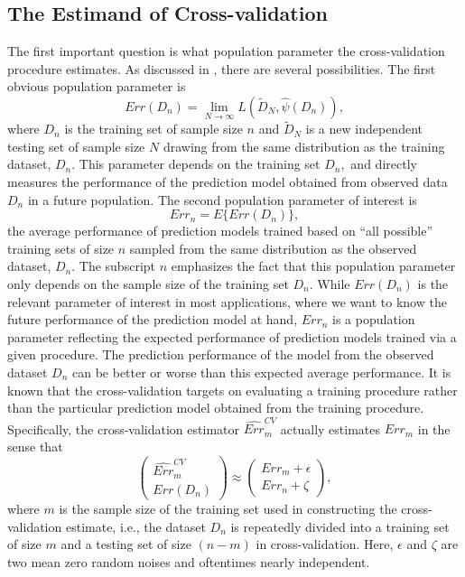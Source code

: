 \documentclass[12pt]{article}
\begin{document}
\subsection{The Estimand of Cross-validation}
The first important question is what population parameter the cross-validation procedure estimates. As discussed in \cite{bates2021cross}, there are several possibilities.  The first obvious population parameter is 
$$ Err(D_n)=  \lim_{N \rightarrow \infty} L\left(\tilde{D}_N, \hat{\psi}(D_n)\right),$$
where $D_n$ is the training set of sample size $n$ and $\tilde{D}_N$ is a new independent testing set of sample size $N$ drawing from the same distribution as the training dataset, $D_n$. This parameter depends on the training set $D_n,$ and directly measures the performance of the prediction model obtained from observed data $D_n$ in a future population. The second population parameter of interest is 
$$ Err_n=E\{Err(D_n)\},$$
the average performance of prediction models trained based on ``all possible'' training sets of size $n$ sampled from the same distribution as the observed dataset, $D_n.$ The subscript $n$ emphasizes the fact that this population parameter only depends on the sample size of the training set $D_n.$ While $Err(D_n)$ is the relevant parameter of interest in most applications, where we want to know the future performance of the prediction model at hand,  $Err_n$ is a population parameter reflecting the expected performance of prediction models trained via a given procedure. The prediction performance of the model from the observed dataset $D_n$ can be better or worse than this expected average performance. It is known that the cross-validation targets on evaluating a training procedure rather than the particular prediction model obtained from the training procedure. Specifically, the cross-validation estimator $\widehat{Err}^{CV}_m$ actually estimates $Err_m$ in the sense that 
$$\left(\begin{array}{c} \widehat{Err}_m^{CV} \\ Err(D_n) \end{array}\right)\approx \left(\begin{array}{c} Err_m+\epsilon \\ Err_n+\zeta \end{array}\right),$$
where $m$ is the sample size of the training set used in constructing the cross-validation estimate, i.e., the dataset $D_n$ is repeatedly divided into a training set of size $m$ and a testing set of size $(n-m)$ in cross-validation. Here, $\epsilon$ and $\zeta$ are two mean zero random noises and oftentimes nearly independent.
\end{document}
